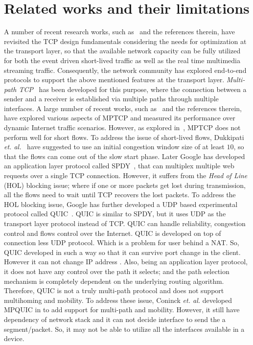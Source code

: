 \section{Related works and their limitations} 
A number of recent research works, such as~\cite{yadav2016msocket,abdrabou2016experimental,de2016observing,de2016throughput,islam2016start,maity2017tcp,liu2016improving,mpquic-measure} and the references therein, have revisited the TCP design fundamentals considering the needs for optimization at the transport layer, so that the available network capacity can be fully utilized for both the event driven short-lived traffic as well as the real time multimedia streaming traffic.
Consequently, the network community has explored end-to-end protocols to support the above mentioned features at the transport layer. 
{\em Multi-path TCP}~\cite{paasch2014multipath} has been developed for this purpose, where the connection between a sender and a receiver is established via multiple paths through multiple interfaces. A large number of recent works, such as~\cite{oh2016feedback,barik2016lisa} and the references therein, have explored various aspects of MPTCP and measured its performance over dynamic Internet traffic scenarios. However, as explored in~\cite{kheirkhah2016mmptcp}, MPTCP does not perform well for short flows. 
To address the issue of short-lived flows, Dukkipati \textit{et. al.}~\cite{largecwnd} have suggested to use an initial congestion window size of at least $10$, so that the flows can come out of the slow start phase. 
Later Google has developed an application layer protocol called SPDY~\cite{erman2015towards}, that can multiplex multiple web requests over a single TCP connection. However, it suffers from the {\em Head of Line} (HOL) blocking issue; where if one or more packets get lost during transmission, all the flows need to wait until TCP recovers the lost packets. To address the HOL blocking issue, Google has further developed a UDP based experimental protocol called QUIC~\cite{carlucci2015http,cui2017innovating}. QUIC is similar to SPDY, but it uses UDP as the transport layer protocol instead of TCP. QUIC can handle reliability, congestion control and flows control over the Internet. QUIC is developed on top of connection less UDP protocol. Which is a problem for user behind a NAT. So, QUIC developed in such a way so that it can survive port change in the client. However it can not change IP address \cite{quic-deployment}. Also, being an application layer protocol, it does not have any control over the path it selects; and the path selection mechanism is completely dependent on the underlying routing algorithm. Therefore, QUIC is not a truly multi-path protocol and does not support multihoming and mobility. To address these issue, Coninck {\em et. al.} developed MPQUIC in \cite{mpquic-measure} to add support for multi-path and mobility. However, it still have dependency of network stack and it can not decide interface to send the a segment/packet. So, it may not be able to utilize all the interfaces available in a device. 
